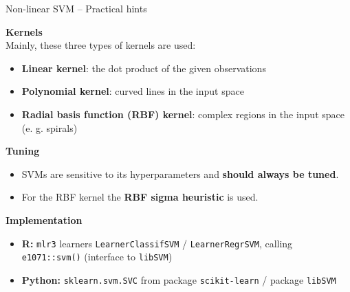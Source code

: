 \documentclass[11pt,compress,t,notes=noshow, xcolor=table]{beamer}
\newcommand{\highlight}[1]{\textcolor{highlightcol}{\textbf{#1}}}
\let\code=\texttt
\begin{document}
\begin{frame}{Non-linear SVM -- Practical hints}

\footnotesize

  \highlight{Kernels} \\
  \smallskip
 Mainly, these three types of kernels are used: 
 \begin{itemize}
 
 \item \textbf{Linear kernel}: the dot product of the given observations
 
 \item \textbf{Polynomial kernel}: curved lines in the input space
 
 \item \textbf{Radial basis function (RBF) kernel}: complex regions in the input space (e. g. spirals)
 
 \end{itemize}
 
 

\medskip

 \highlight{Tuning} \\
 \begin{itemize}
    \item SVMs are sensitive to its hyperparameters and \textbf{should always be tuned}. 
    \item For the RBF kernel the \textbf{RBF sigma heuristic} is used. 
  \end{itemize}
  

  \medskip

   \highlight{Implementation} 
  \begin{itemize}
    \item \textbf{R:} \code{mlr3} learners \code{LearnerClassifSVM} / 
    \code{LearnerRegrSVM}, calling \code{e1071::svm()} (interface to \code{libSVM})
    \item \textbf{Python:} \code{sklearn.svm.SVC} from package \code{scikit-learn} / package \code{libSVM}
  \end{itemize}

\end{frame}


\end{document}
